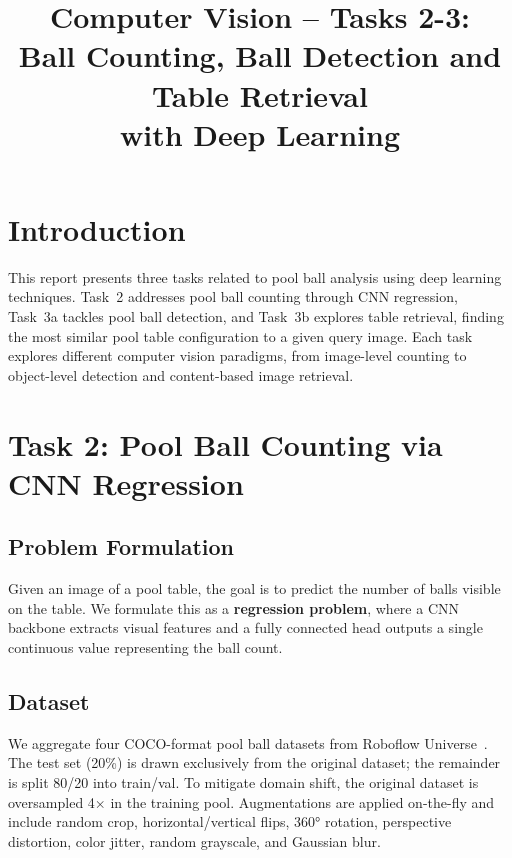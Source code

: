 \documentclass[conference, 10pt]{IEEEtran}
\title{\LARGE Computer Vision -- Tasks 2-3:\\Ball Counting, Ball Detection and Table Retrieval\\with Deep Learning}
\author{
  \IEEEauthorblockN{João Proença, Joana Pimenta, Ricardo Ribeiro}
  \IEEEauthorblockA{M.IA | FEUP, 2025/2026}
}
\begin{document}
\maketitle


\section{Introduction}

This report presents three tasks related to pool ball analysis using deep learning techniques.
Task~2 addresses pool ball counting through CNN regression, Task~3a tackles pool ball detection, and Task~3b explores table retrieval, finding the most similar pool table configuration to a given query image.
Each task explores different computer vision paradigms, from image-level counting to object-level detection and content-based image retrieval.


\section{Task 2: Pool Ball Counting via CNN Regression}

\subsection{Problem Formulation}

Given an image of a pool table, the goal is to predict the number of balls visible on the table.
We formulate this as a \textbf{regression problem}, where a CNN backbone extracts visual features and a fully connected head outputs a single continuous value representing the ball count.

\subsection{Dataset}
We aggregate four COCO-format pool ball datasets from Roboflow Universe~\cite{ds_8ballpool, ds_poolbilliard, ds_poolballsdetection, ds_poolballdetection}.
The test set (20\%) is drawn exclusively from the original dataset; the remainder is split 80/20 into train/val.
To mitigate domain shift, the original dataset is oversampled 4$\times$ in the training pool.
Augmentations are applied on-the-fly and include random crop, horizontal/vertical flips, 360° rotation, perspective distortion, color jitter, random grayscale, and Gaussian blur.
\end{document}
